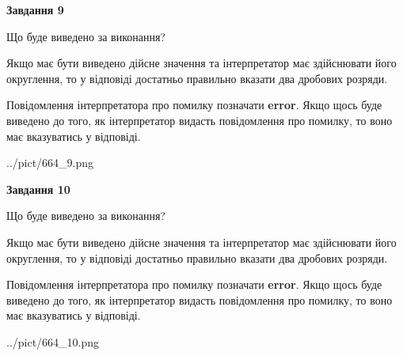 \documentclass[12pt, ukrainian]{article}
\begin{document}
{\begin {Large}
{\begin {center}\textbf{Завдання 9}\end {center}}\par
Що буде виведено за виконання? \par

Якщо має бути виведено дійсне значення та інтерпретатор має здійснювати його округлення, 
то у відповіді достатньо правильно вказати два дробових розряди.

Повідомлення інтерпретатора про помилку позначати \textbf{error}.
Якщо щось буде виведено до того, як інтерпретатор видасть повідомлення про помилку, 
то воно має вказуватись у відповіді. \par

\begin{center}
	{../pict/664_9.png}
\end{center}
\newpage

{\begin {center}\textbf{Завдання 10}\end {center}}\par
Що буде виведено за виконання? \par

Якщо має бути виведено дійсне значення та інтерпретатор має здійснювати його округлення, 
то у відповіді достатньо правильно вказати два дробових розряди.

Повідомлення інтерпретатора про помилку позначати \textbf{error}.
Якщо щось буде виведено до того, як інтерпретатор видасть повідомлення про помилку, 
то воно має вказуватись у відповіді. \par

\begin{center}
	{../pict/664_10.png}
\end{center}
\newpage

\end {Large}}
\end{document}
